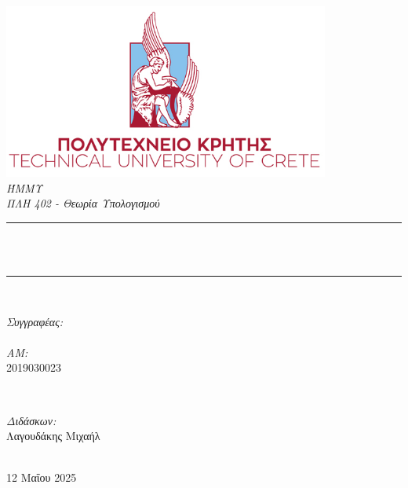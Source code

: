 \doublespacing
\begin{titlepage}
    \newcommand{\HRule}{\rule{\linewidth}{1mm}}
    \center
    \includegraphics[width=0.7\linewidth]{title/TUC_Logo.png}\\[1cm]
    \textsl{\Large ΉΜΜΥ}\\[0.5cm]
    \textsl{\Huge ΠΛΗ 402 - Θεωρία Υπολογισμού}\\[1cm]
    \makeatletter
    \HRule \\[0.6cm]
    { \huge \bfseries \@title}\\[0.3cm]
    \HRule \\[2cm]
    \large

    \begin{minipage}{0.45\textwidth}
    	\begin{flushleft}
            \emph{Συγγραφέας:}\\
            \@author \\

            \emph{AM:}\\
            2019030023
        \end{flushleft}
    \end{minipage}
    ~
    \begin{minipage}{0.45\textwidth}
    	\begin{flushright}
            {\emph{Διδάσκων:}} \\
            \textup{Λαγουδάκης Μιχαήλ}
        \end{flushright}
    \end{minipage}\\[2cm]
    \makeatother
    {\large 12 Μαΐου 2025}\\%

\end{titlepage}
